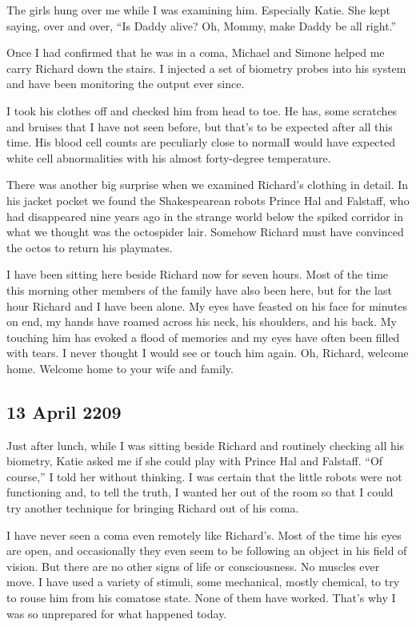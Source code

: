 \documentclass[]{article}
\begin{document}
{	The girls hung over me while I was examining him. Especially Katie. She kept saying, over and over, “Is Daddy alive? Oh, Mommy, make Daddy be all right.”
	
	Once I had confirmed that he was in a coma, Michael and Simone helped me carry Richard down the stairs. I injected a set of biometry probes into his system and have been monitoring the output ever since.
	
	I took his clothes off and checked him from head to toe. He has, some scratches and bruises that I have not seen before, but that’s to be expected after all this time. His blood cell counts are peculiarly close to normalI would have expected white cell abnormalities with his almost forty-degree temperature.
	
	There was another big surprise when we examined Richard’s clothing in detail. In his jacket pocket we found the Shakespearean robots Prince Hal and Falstaff, who had disappeared nine years ago in the strange world below the spiked corridor in what we thought was the octospider lair. Somehow Richard must have convinced the octos to return his playmates.
	
	I have been sitting here beside Richard now for seven hours. Most of the time this morning other members of the family have also been here, but for the last hour Richard and I have been alone. My eyes have feasted on his face for minutes on end, my hands have roamed across his neck, his shoulders, and his back. My touching him has evoked a flood of memories and my eyes have often been filled with tears. I never thought I would see or touch him again. Oh, Richard, welcome home. Welcome home to your wife and family.

\subsection{13 April 2209}

Just after lunch, while I was sitting beside Richard and routinely checking all his biometry, Katie asked me if she could play with Prince Hal and Falstaff. “Of course,” I told her without thinking. I was certain that the little robots were not functioning and, to tell the truth, I wanted her out of the room so that I could try another technique for bringing Richard out of his coma.

I have never seen a coma even remotely like Richard’s. Most of the time his eyes are open, and occasionally they even seem to be following an object in his field of vision. But there are no other signs of life or consciousness. No muscles ever move. I have used a variety of stimuli, some mechanical, mostly chemical, to try to rouse him from his comatose state. None of them have worked. That’s why I was so unprepared for what happened today.

}
\end{document}
